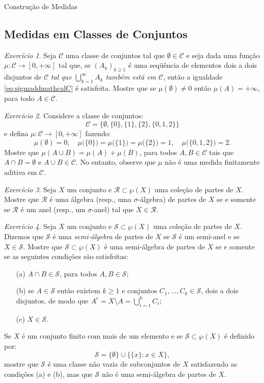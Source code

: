 \documentclass[oneside,final,11pt]{amsbook}
\newcommand{\compl}{\mathrm c}
\theoremstyle{remark}\newtheorem{exercise}{Exercício}[chapter]
\theoremstyle{remark}\newtheorem{*exercise}[exercise]{\hbox to 0pt{\hskip 0pt minus 1fil*}Exercício}
\theoremstyle{definition}\newtheorem{exdefin}{Definição}[chapter]
\theoremstyle{plain}\newtheorem{teo}{Teorema}[section]
\theoremstyle{plain}\newtheorem{lem}[teo]{Lema}
\theoremstyle{plain}\newtheorem{prop}[teo]{Proposição}
\theoremstyle{plain}\newtheorem{cor}[teo]{Corolário}
\theoremstyle{definition}\newtheorem{defin}[teo]{Definição}
\theoremstyle{remark}\newtheorem{rem}[teo]{Observação}
\theoremstyle{definition}\newtheorem{notation}[teo]{Notação}
\theoremstyle{definition}\newtheorem{convention}[teo]{Convenção}
\theoremstyle{definition}\newtheorem{example}[teo]{Exemplo}
\numberwithin{section}{chapter}
\numberwithin{equation}{section}
\begin{document}
\begin{chapter}{Construção de Medidas}
\subsection*{Medidas em Classes de Conjuntos}

\begin{exercise}\label{exe:tudoinfinito}
Seja $\mathcal C$ uma classe de conjuntos tal que $\emptyset\in\mathcal C$ e seja dada uma função $\mu:\mathcal C\to[0,+\infty]$
tal que, se $(A_k)_{k\ge1}$ é uma seqüência de elementos dois a dois disjuntos de $\mathcal C$
{\em tal que $\bigcup_{k=1}^\infty A_k$ também está em $\mathcal C$}, então a igualdade \eqref{eq:sigmaddmathcalC}
é satisfeita. Mostre que se $\mu(\emptyset)\ne0$ então $\mu(A)=+\infty$, para todo $A\in\mathcal C$.
\end{exercise}

\begin{exercise}\label{exe:naobastadois}
Considere a classe de conjuntos:
\[\mathcal C=\big\{\emptyset,\{0\},\{1\},\{2\},\{0,1,2\}\big\}\]
e defina $\mu:\mathcal C\to[0,+\infty]$ fazendo:
\[\mu(\emptyset)=0,\quad\mu\big(\{0\}\big)=\mu\big(\{1\}\big)=\mu\big(\{2\}\big)=1,\quad\mu\big(\{0,1,2\}\big)=2.\]
Mostre que $\mu(A\cup B)=\mu(A)+\mu(B)$, para todos $A,B\in\mathcal C$ tais que $A\cap B=\emptyset$ e $A\cup B\in\mathcal C$.
No entanto, observe que $\mu$ não é uma medida finitamente aditiva em $\mathcal C$.
\end{exercise}

\begin{exercise}\label{exe:anelalgebra}
Seja $X$ um conjunto e $\mathcal R\subset\wp(X)$ uma coleção de partes de $X$. Mostre que
$\mathcal R$ é uma álgebra (resp., uma $\sigma$-álgebra) de partes de $X$ se e somente se $\mathcal R$ é um anel
(resp., um $\sigma$-anel) tal que $X\in\mathcal R$.
\end{exercise}

\begin{exercise}\label{exe:semialgebra}
Seja $X$ um conjunto e $\mathcal S\subset\wp(X)$ uma coleção de partes de $X$. Dizemos que $\mathcal S$ é
uma {\em semi-álgebra\/} de partes de $X$ se $\mathcal S$ é um semi-anel
e se $X\in\mathcal S$. Mostre que $\mathcal S\subset\wp(X)$ é uma semi-álgebra de partes de $X$ se e somente se
as seguintes condições são satisfeitas:
\begin{itemize}
\item[(a)] $A\cap B\in\mathcal S$, para todos $A,B\in\mathcal S$;
\item[(b)] se $A\in\mathcal S$ então existem $k\ge1$ e conjuntos $C_1,\ldots,C_k\in\mathcal S$, dois a dois disjuntos,
de modo que $A^\compl=X\setminus A=\bigcup_{i=1}^kC_i$;
\item[(c)] $X\in\mathcal S$.
\end{itemize}
Se $X$ é um conjunto finito com mais de um elemento e se $\mathcal S\subset\wp(X)$ é definido por:
\[\mathcal S=\{\emptyset\}\cup\big\{\{x\}:x\in X\big\},\]
mostre que $\mathcal S$ é uma classe não vazia de subconjuntos de $X$ satisfazendo as condições (a) e (b),
mas que $\mathcal S$ não é uma semi-álgebra de partes de $X$.
\end{exercise}


\end{chapter}
\end{document}
